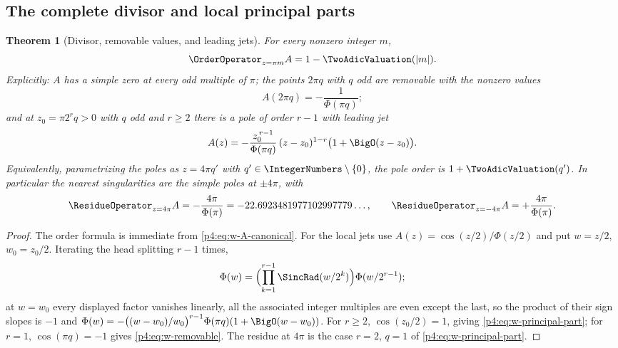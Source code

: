 \documentclass[11pt,oneside]{article}
\numberwithin{equation}{section}
\newtheorem{theorem}{Theorem}[section]
\theoremstyle{definition}
\theoremstyle{remark}
\begin{document}
\subsection{The complete divisor and local principal parts}

\begin{theorem}[Divisor, removable values, and leading jets]
\label{p4:thm:w-divisor}
For every nonzero integer $m$,
\begin{equation}
 \OrderOperator_{z=\pi m}A=1-\TwoAdicValuation(|m|).
 \label{p4:eq:w-divisor}
\end{equation}
Explicitly: $A$ has a simple zero at every odd multiple of $\pi$; the points
$2\pi q$ with $q$ odd are removable with the nonzero values
\begin{equation}
 A(2\pi q)=-\frac1{\Phi(\pi q)};
 \label{p4:eq:w-removable}
\end{equation}
and at $z_0=\pi2^rq>0$ with $q$ odd and $r\ge2$ there is a pole of order
$r-1$ with leading jet
\begin{equation}
 A(z)=-\frac{z_0^{\,r-1}}{\Phi(\pi q)}\,
 (z-z_0)^{1-r}\bigl(1+\BigO(z-z_0)\bigr).
 \label{p4:eq:w-principal-part}
\end{equation}
Equivalently, parametrizing the poles as $z=4\pi q'$ with
$q'\in\IntegerNumbers\setminus\{0\}$, the pole order is $1+\TwoAdicValuation(q')$.  In particular the
nearest singularities are the simple poles at $\pm4\pi$, with
\begin{equation}
 \ResidueOperator_{z=4\pi}A=-\frac{4\pi}{\Phi(\pi)}
 =-22.6923481977102997779\ldots,
 \qquad
 \ResidueOperator_{z=-4\pi}A=+\frac{4\pi}{\Phi(\pi)}.
 \label{p4:eq:w-residues}
\end{equation}
\end{theorem}

\begin{proof}
The order formula is immediate from \eqref{p4:eq:w-A-canonical}.  For the local
jets use $A(z)=\cos(z/2)/\Phi(z/2)$ and put $w=z/2$, $w_0=z_0/2$.  Iterating
the head splitting $r-1$ times,
\[
 \Phi(w)=\Bigl(\prod_{k=1}^{r-1}\SincRad(w/2^k)\Bigr)\Phi(w/2^{r-1});
\]
at $w=w_0$ every displayed factor vanishes linearly, all the associated
integer multiples are even except the last, so the product of their sign
slopes is $-1$ and
$\Phi(w)=-\bigl((w-w_0)/w_0\bigr)^{r-1}\Phi(\pi q)(1+\BigO(w-w_0))$.
For $r\ge2$, $\cos(z_0/2)=1$, giving \eqref{p4:eq:w-principal-part}; for $r=1$,
$\cos(\pi q)=-1$ gives \eqref{p4:eq:w-removable}.  The residue at $4\pi$ is the
case $r=2$, $q=1$ of \eqref{p4:eq:w-principal-part}.
\end{proof}
\end{document}

